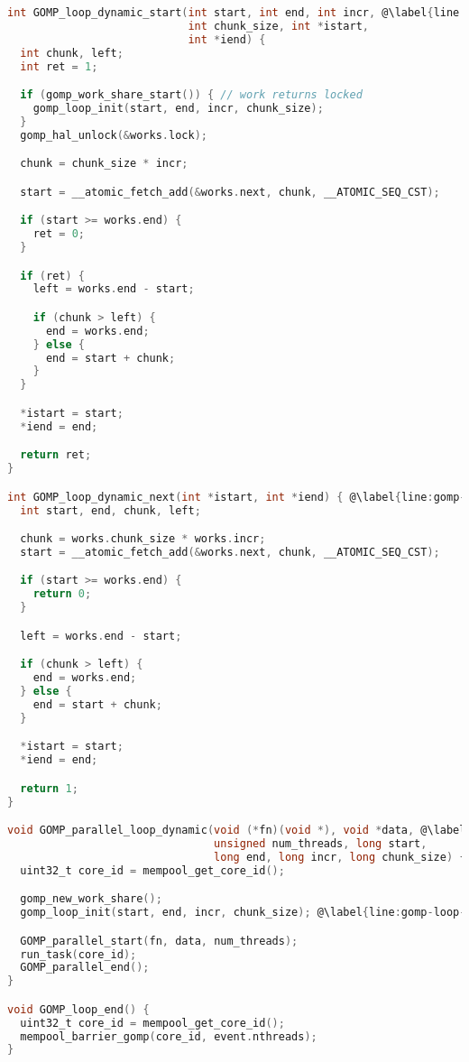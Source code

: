 \begin{lstlisting}[language=C, caption={GOMP Dynamic For Loop Implementation},
                   label={lst:gomp-loop-dynamic}, escapechar=@]
int GOMP_loop_dynamic_start(int start, int end, int incr, @\label{line:gomp-loop-dynamic-start}@
                            int chunk_size, int *istart,
                            int *iend) {
  int chunk, left;
  int ret = 1;

  if (gomp_work_share_start()) { // work returns locked
    gomp_loop_init(start, end, incr, chunk_size);
  }
  gomp_hal_unlock(&works.lock);

  chunk = chunk_size * incr;

  start = __atomic_fetch_add(&works.next, chunk, __ATOMIC_SEQ_CST);

  if (start >= works.end) {
    ret = 0;
  }

  if (ret) {
    left = works.end - start;

    if (chunk > left) {
      end = works.end;
    } else {
      end = start + chunk;
    }
  }

  *istart = start;
  *iend = end;

  return ret;
}

int GOMP_loop_dynamic_next(int *istart, int *iend) { @\label{line:gomp-loop-dynamic-next}@
  int start, end, chunk, left;

  chunk = works.chunk_size * works.incr;
  start = __atomic_fetch_add(&works.next, chunk, __ATOMIC_SEQ_CST);

  if (start >= works.end) {
    return 0;
  }

  left = works.end - start;

  if (chunk > left) {
    end = works.end;
  } else {
    end = start + chunk;
  }

  *istart = start;
  *iend = end;

  return 1;
}

void GOMP_parallel_loop_dynamic(void (*fn)(void *), void *data, @\label{line:gomp-parallel-loop-dynamic}@
                                unsigned num_threads, long start,
                                long end, long incr, long chunk_size) {
  uint32_t core_id = mempool_get_core_id();

  gomp_new_work_share();
  gomp_loop_init(start, end, incr, chunk_size); @\label{line:gomp-loop-init}@

  GOMP_parallel_start(fn, data, num_threads);
  run_task(core_id);
  GOMP_parallel_end();
}

void GOMP_loop_end() {
  uint32_t core_id = mempool_get_core_id();
  mempool_barrier_gomp(core_id, event.nthreads);
}
\end{lstlisting}

